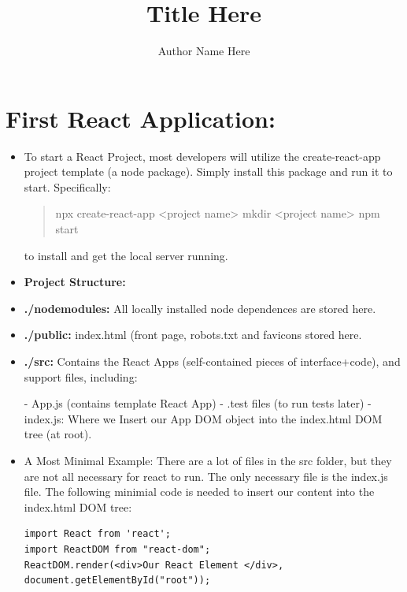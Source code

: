\documentclass[8pt,a4paper]{extarticle}
\title{Title Here}
\author{Author Name Here}
\begin{document}
\newcommand{\mitem}{\item[$\square$]}
\newcommand{\mmitem}{\item[$\triangledown$]}

\maketitle


\section*{First React Application:}

\begin{itemize}
\item To start a React Project, most developers will utilize the create-react-app project template (a node package). Simply install this package and run it to start.
Specifically:

\begin{verse}

npx create-react-app <project name>
mkdir <project name>
npm start

\end{verse}

to install and get the local server running.

\item \textbf{Project Structure:}
\item \textbf{./nodemodules:} All locally installed node dependences are stored here.
\item \textbf{./public:} index.html (front page, robots.txt and favicons stored here.
\item \textbf{./src:} Contains the React Apps (self-contained pieces of interface+code), and support files, including:

- App.js (contains template React App)
- .test files (to run tests later)
- index.js: Where we Insert our App DOM object into the index.html DOM tree (at root).

\item A Most Minimal Example: There are a lot of files in the src folder, but they are not all necessary for react to run. The only necessary file is the index.js file. The following minimial code is needed to insert our content into the index.html DOM tree:

\begin{verbatim}
import React from 'react';
import ReactDOM from "react-dom";
ReactDOM.render(<div>Our React Element </div>, 
document.getElementById("root"));
\end{verbatim}


\end{itemize}
\end{document}
